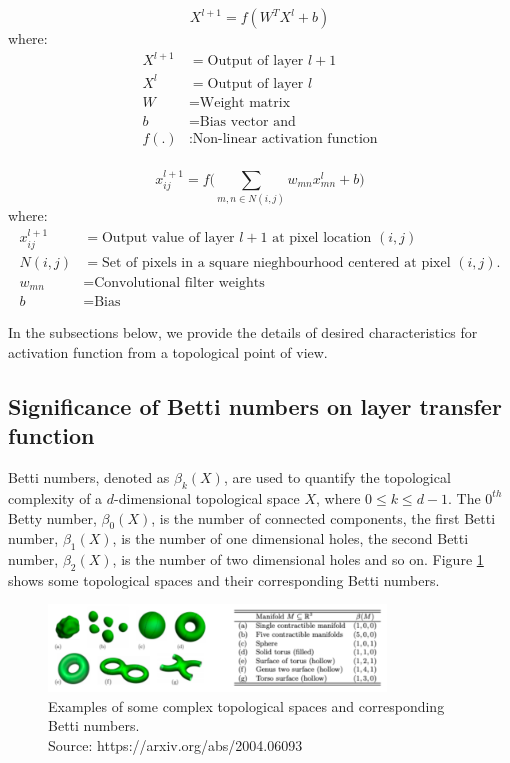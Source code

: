 \documentclass[wcp]{jmlr}
\begin{document}
\begin{equation} \label{eq:1}
  X^{l + 1} = f(W^TX^{l} + b)
\end{equation}
where:
\begin{align*}
X^{l + 1} &= \text{Output of layer $l + 1$ }\\
X^{l} &= \text{Output of layer $l$} \\
W &= \text{Weight matrix} \\
b &= \text{Bias vector and} \\
f(.) &: \text{Non-linear activation function}\\
\end{align*}

\begin{equation} \label{eq:2}
  x_{ij}^{l + 1} = f(\sum_{m,n \in N(i,j)}{w_{mn}x_{mn}^{l} + b)}
\end{equation}
where:
\begin{align*}
x_{ij}^{l + 1} &= \text{Output value of layer $l + 1$ at pixel location $(i,j)$ }\\
N(i,j) &= \text{Set of pixels in a square nieghbourhood centered at pixel $(i,j)$.} \\
w_{mn} &= \text{Convolutional filter weights } \\
b &= \text{Bias }
\end{align*}

In the subsections below, we provide the details of desired characteristics for activation function from a topological point of view.

\subsection{Significance of Betti numbers on  layer transfer function}
Betti numbers, denoted as $\beta_k(X)$,   are used to quantify the topological complexity of a $d$-dimensional topological space  $X$, where  $0 \leq k \leq d-1$. The  $0^{th}$ Betty number, $\beta_0(X)$, is the number of connected components, the first Betti number, $\beta_1(X)$, is the number of one dimensional holes, the second Betti number, $\beta_2(X)$, is the number of two dimensional holes and so on. Figure \ref{fig:bett_numbers_illustration} shows some topological spaces and their corresponding Betti numbers.

\begin{figure}[htp]
\begin{center}
\includegraphics[width=0.8\textwidth]{images/bett_numbers_illustration.png}
\caption{Examples of some complex topological spaces and corresponding Betti numbers.\\ \footnotesize{Source: https://arxiv.org/abs/2004.06093}}
\label{fig:bett_numbers_illustration}
\end{center}
\end{figure}
\end{document}
